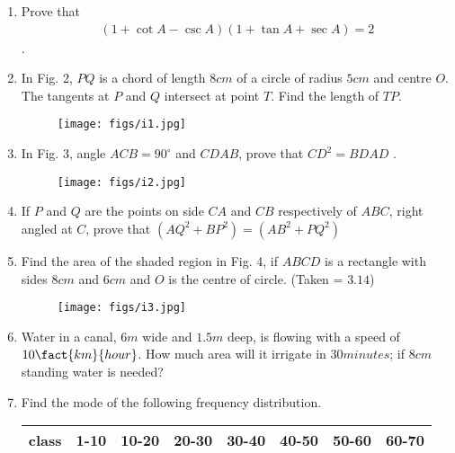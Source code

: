 \documentclass[12pt]{article}
\begin{document}
\begin{enumerate}
	\item Prove that \begin{align*}(1+\cot A - \csc A) (1 + \tan A +\sec A) = 2 \end{align*}.
\item In Fig. 2, $PQ$ is a chord of length $8 cm$ of a circle of radius $5 cm$ and centre $O$. The tangents at $P$ and $Q$ intersect at point $T$. Find the length of $TP$.
\begin{figure}[!ht]                                                            \centering
                        \texttt{[image: figs/i1.jpg]}
			\caption{}

                \end{figure}
\item In Fig. 3, angle $ACB = 90^\circ$  and $CDAB$, prove that $CD ^ 2 = BDAD$ .
\begin{figure}[!ht]                                                            \centering
                        \texttt{[image: figs/i2.jpg]}
			\caption{}

                \end{figure}
\item If $P$ and $Q$ are the points on side $CA$ and $CB$ respectively of  $ABC$, right angled at $C$, prove that $(AQ^2 + BP^2) = (AB^2 +PQ^2)$
\item Find the area of the shaded region in Fig. 4, if $ABCD$ is a rectangle with sides $8 cm$ and $6 cm$ and $O$ is the centre of circle. (Taken = $3.14$)
	\begin{figure}[!ht]                                                            \centering
                        \texttt{[image: figs/i3.jpg]}
                        \caption{}

                \end{figure}

\item Water in a canal, $6 m$ wide and $1.5 m$ deep, is flowing with a speed of $10\fact{km}{hour}$. How much area will it irrigate in $30 minutes$; if $8 cm$ standing water is needed?



\item Find the mode of the following frequency distribution.



  \begin{tabular}{|c|c|c|c|c|c|c|c|}
    \hline
    class & 1-10 & 10-20 & 20-30 & 30-40 & 40-50 & 50-60 & 60-70 \\
    \hline
    

\end{tabular}
\end{enumerate}
\end{document}
